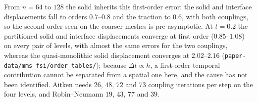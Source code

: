 From $n = 64$ to $128$ the solid inherits this first-order error: the solid and interface displacements fall to orders $0.7$--$0.8$ and the traction to $0.6$, with both couplings, so the second order seen on the coarser meshes is pre-asymptotic.
At $t = 0.2$ the partitioned solid and interface displacements converge at first order ($0.85$--$1.08$) on every pair of levels, with almost the same errors for the two couplings, whereas the quasi-monolithic solid displacement converges at $2.02$--$2.16$ (\texttt{paper-data/mms\_fsi/order\_tables/}); because $\Delta t \propto h$, a first-order temporal contribution cannot be separated from a spatial one here, and the cause has not been identified.
Aitken needs $26$, $48$, $72$ and $73$ coupling iterations per step on the four levels, and Robin--Neumann $19$, $43$, $77$ and $39$.


